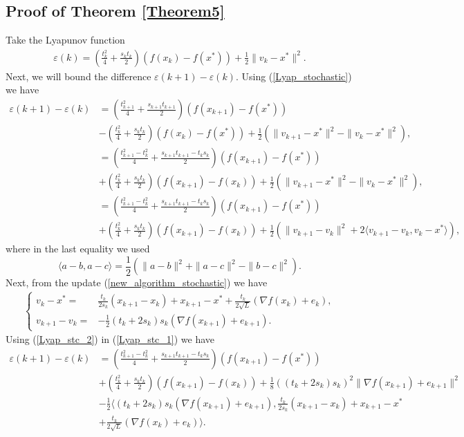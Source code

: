 \documentclass{article}
\theoremstyle{plain}
\theoremstyle{definition}
\theoremstyle{remark}
\begin{document}
\subsection{Proof of Theorem \ref{Theorem5}}\label{thm6_proof}
Take the Lyapunov function
    \begin{align}\label{Lyap_stochastic}
    \varepsilon(k)= (\frac{t_k^2}{4}+\frac{s_kt_k}{2})(f(x_k)-f(x^*))+\frac{1}{2}\|v_k-x^*\|^2.
    \end{align}
    Next, we will bound the difference $\varepsilon(k+1)-\varepsilon(k)$. Using (\ref{Lyap_stochastic}) we have
    \begin{align}\label{Lyap_stc_1}
        \varepsilon(k+1)-\varepsilon(k)&=(\frac{t_{k+1}^2}{4}+\frac{s_{k+1}t_{k+1}}{2})(f(x_{k+1})-f(x^*))\nonumber\\
        &-(\frac{t_{k}^2}{4}+\frac{s_{k}t_{k}}{2})(f(x_{k})-f(x^*))+\frac{1}{2}(\|v_{k+1}-x^*\|^2-\|v_{k}-x^*\|^2),\nonumber\\
        & = (\frac{t_{k+1}^2-t_k^2}{4}+\frac{s_{k+1}t_{k+1}-t_ks_k}{2})(f(x_{k+1})-f(x^*))\nonumber\\
        &+(\frac{t_{k}^2}{4}+\frac{s_{k}t_{k}}{2})(f(x_{k+1})-f(x_k))+\frac{1}{2}(\|v_{k+1}-x^*\|^2-\|v_{k}-x^*\|^2),\nonumber\\
        &= (\frac{t_{k+1}^2-t_k^2}{4}+\frac{s_{k+1}t_{k+1}-t_ks_k}{2})(f(x_{k+1})-f(x^*))\nonumber\\
        &+(\frac{t_{k}^2}{4}+\frac{s_{k}t_{k}}{2})(f(x_{k+1})-f(x_k))+\frac{1}{2}(\|v_{k+1}-v_k\|^2+2\langle v_{k+1}-v_k,v_k-x^*\rangle),
    \end{align}
    where in the last equality we used 
    $$\langle a-b,a-c\rangle = \frac{1}{2}(\|a-b\|^2+\|a-c\|^2-\|b-c\|^2).$$
    Next, from the update (\ref{new_algorithm_stochastic}) we have
    \begin{align}\label{Lyap_stc_2}
        \left\{\begin{array}{cl}
             v_k-x^*=&\frac{t_k}{2s_k}(x_{k+1}-x_k)+x_{k+1}-x^*+\frac{t_k}{2\sqrt{L}}(\nabla f(x_k)+e_k),  \\
            v_{k+1}-v_k=& -\frac{1}{2}(t_k+2s_k)s_k (\nabla f(x_{k+1})+e_{k+1}).
        \end{array}\right.
    \end{align}
    Using (\ref{Lyap_stc_2}) in (\ref{Lyap_stc_1}) we have
    \begin{align}\label{Lyap_stc_3}
        \varepsilon(k+1)-\varepsilon(k)&=(\frac{t_{k+1}^2-t_k^2}{4}+\frac{s_{k+1}t_{k+1}-t_ks_k}{2})(f(x_{k+1})-f(x^*))\nonumber\\
        &+(\frac{t_{k}^2}{4}+\frac{s_{k}t_{k}}{2})(f(x_{k+1})-f(x_k))+\frac{1}{8}((t_k+2s_k)s_k)^2\|\nabla f(x_{k+1})+e_{k+1}\|^2\nonumber\\
        &-\frac{1}{2}\langle (t_k+2s_k)s_k (\nabla f(x_{k+1})+e_{k+1}), \frac{t_k}{2s_k}(x_{k+1}-x_k)+x_{k+1}-x^*\nonumber\\
        &+\frac{t_k}{2\sqrt{L}}(\nabla f(x_k)+e_k)\rangle.
    \end{align}
\end{document}
